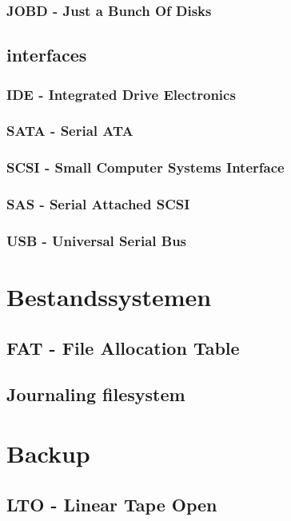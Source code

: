 \documentclass[a4paper,12pt,twoside,openright,titlepage]{book}
\begin{document}
\subsection{JOBD - Just a Bunch Of Disks}

\section{interfaces}
\subsection{IDE - Integrated Drive Electronics}
\subsection{SATA - Serial ATA}
\subsection{SCSI - Small Computer Systems Interface}

\subsection{SAS - Serial Attached SCSI}
\subsection{USB - Universal Serial Bus}

\chapter{Bestandssystemen}

\section{FAT - File Allocation Table}
\section{Journaling filesystem}

\chapter{Backup}
\section{LTO - Linear Tape Open}
\end{document}
